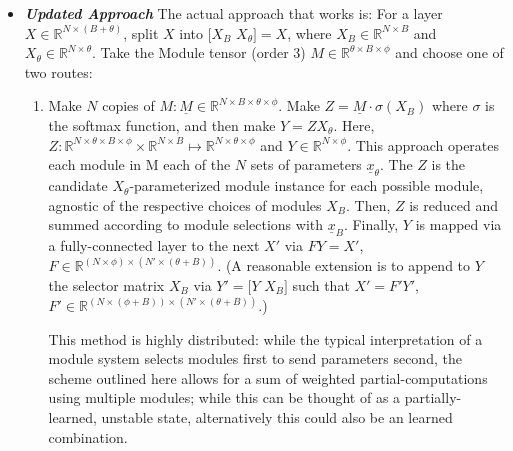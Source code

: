 \documentclass[12pt]{article}
\begin{document}
\begin{itemize}

\item \label{Updated Approach} \textit{\textbf{Updated Approach}}
	The actual approach that works is:
	For a layer $X \in \mathbb{R}^{N \times (B+\theta)}$, split $X$ into $[X_B$ $X_\theta] = X$, where $X_B \in \mathbb{R}^{N \times B}$ and $X_{\theta}  \in \mathbb{R}^{N \times \theta}$.  Take the Module tensor (order 3) $M \in \mathbb{R}^{\theta \times B \times \phi}$ and choose one of two routes:
	\begin{enumerate}
	\item Make $N$ copies of $M : \underline{M} \in \mathbb{R}^{N \times B \times \theta \times \phi}$.  Make $Z=\underline{M}\cdot\sigma(X_B)$ where $\sigma$ is the softmax function, and then make $Y=ZX_{\theta}$.  Here, $Z: \mathbb{R}^{N\times\theta\times B \times \phi} \times \mathbb{R}^{N \times B} \mapsto \mathbb{R}^{N \times \theta \times \phi}$ and $Y \in \mathbb{R}^{N \times \phi}$.  This approach operates each module in M each of the $N$ sets of parameters $\underline{x}_{\theta}$.  The $Z$ is the candidate $X_{\theta}$-parameterized module instance for each possible module, agnostic of the respective choices of modules $X_B$. Then, $Z$ is reduced  and summed according to module selections with $\underline{x}_B$.  Finally, $Y$ is mapped via a fully-connected layer to the next $X'$ via $FY=X'$, $F \in \mathbb{R}^{(N \times \phi) \times (N' \times (\theta + B))}$. (A reasonable extension is to append to $Y$ the selector matrix $X_B$ via $Y' = [Y$ $X_B]$ such that $X' = F'Y'$, $F' \in \mathbb{R}^{(N \times (\phi+B)) \times (N' \times (\theta + B))}$.)
	\par This method is highly distributed: while the typical interpretation of a module system selects modules first to send parameters second, the scheme outlined here allows for a sum of weighted partial-computations using multiple modules;  while this can be thought of as a partially-learned, unstable state, alternatively this could also be an learned combination. 
	

\end{enumerate}
\end{itemize}
\end{document}
